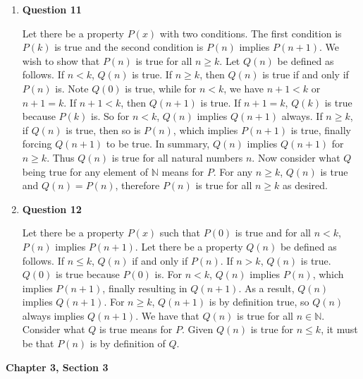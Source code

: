 \documentclass{article}
\begin{document}
\begin{enumerate}
	\item \textbf{Question 11}
	
	\medskip
	
	Let there be a property $P(x)$ with two conditions. The first condition is $P(k)$ is true and the second condition is $P(n)$ implies $P(n + 1)$. We wish to show that $P(n)$ is true for all $n \geq k$. Let $Q(n)$ be defined as follows. If $n < k$, $Q(n)$ is true. If $n \geq k$, then $Q(n)$ is true if and only if $P(n)$ is. Note $Q(0)$ is true, while for $n < k$, we have $n + 1 < k$ or $n + 1 = k$. If $n + 1 < k$, then $Q(n + 1)$ is true. If $n + 1 = k$, $Q(k)$ is true because $P(k)$ is. So for $n < k$, $Q(n)$ implies $Q(n + 1)$ always. If $n \geq k$, if $Q(n)$ is true, then so is $P(n)$, which implies $P(n + 1)$ is true, finally forcing $Q(n + 1)$ to be true. In summary, $Q(n)$ implies $Q(n + 1)$ for $n \geq k$. Thus $Q(n)$ is true for all natural numbers $n$. Now consider what $Q$ being true for any element of $\mathbb{N}$ means for $P$. For any $n \geq k$, $Q(n)$ is true and $Q(n) = P(n)$, therefore $P(n)$ is true for all $n \geq k$ as desired. 
	
	\item \textbf{Question 12}
	
	\medskip
	
	Let there be a property $P(x)$ such that $P(0)$ is true and for all $n < k$, $P(n)$ implies $P(n + 1)$. Let there be a property $Q(n)$ be defined as follows. If $n \leq k$, $Q(n)$ if and only if $P(n)$. If $n > k$, $Q(n)$ is true. $Q(0)$ is true because $P(0)$ is. For $n < k$, $Q(n)$ implies $P(n)$, which implies $P(n + 1)$, finally resulting in $Q(n + 1)$. As a result, $Q(n)$ implies $Q(n + 1)$. For $n \geq k$, $Q(n + 1)$ is by definition true, so $Q(n)$ always implies $Q(n + 1)$. We have that $Q(n)$ is true for all $n \in \mathbb{N}$. Consider what $Q$ is true means for $P$. Given $Q(n)$ is true for $n \leq k$, it must be that $P(n)$ is by definition of $Q$. 
	 \end{enumerate}

	\medskip
	\textbf{Chapter 3, Section 3}
	\medskip
	
\end{document}

